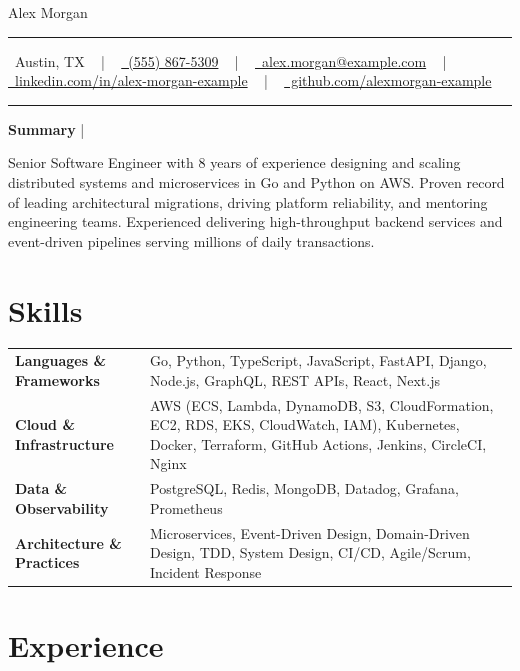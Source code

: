 \documentclass[letterpaper,10pt]{article}
\newcommand{\documentTitle}[2]{
  \begin{center}
    {\Huge\color{accentTitle} #1}
    \vspace{10pt}
    {\color{accentLine} \hrule}
    \vspace{2pt}
    \footnotesize{#2}
    \vspace{2pt}
    {\color{accentLine} \hrule}
  \end{center}
}
\newcommand{\tinysection}[1]{
  \phantomsection
  \addcontentsline{toc}{section}{#1}
  {\large{\bfseries\color{accentText}#1} {\color{accentLine} |}}
}
\begin{document}
  \documentTitle{Alex Morgan}{
    \raisebox{-0.15\height} \faMapMarker~Austin, TX ~ | ~
    \href{tel:5558675309}{
      \raisebox{-0.05\height} \faPhone~(555) 867-5309} ~ | ~
    \href{mailto:alex.morgan@example.com}{
      \raisebox{-0.15\height} \faEnvelope~alex.morgan@example.com} ~ | ~
    \href{https://www.linkedin.com/in/alex-morgan-example/}{
      \raisebox{-0.15\height} \faLinkedin~linkedin.com/in/alex-morgan-example} ~ | ~
    \href{https://github.com/alexmorgan-example}{
      \raisebox{-0.15\height} \faGithub~github.com/alexmorgan-example}
  }

  \tinysection{Summary}
  Senior Software Engineer with 8 years of experience designing and scaling distributed systems and microservices in Go and Python on AWS. Proven record of leading architectural migrations, driving platform reliability, and mentoring engineering teams. Experienced delivering high-throughput backend services and event-driven pipelines serving millions of daily transactions.

\section{Skills}
\begin{tabularx}{\textwidth}{>{\bfseries}l@{\hspace{12pt}} X}
Languages \& Frameworks & Go, Python, TypeScript, JavaScript, FastAPI, Django, Node.js, GraphQL, REST APIs, React, Next.js \\
Cloud \& Infrastructure & AWS (ECS, Lambda, DynamoDB, S3, CloudFormation, EC2, RDS, EKS, CloudWatch, IAM), Kubernetes, Docker, Terraform, GitHub Actions, Jenkins, CircleCI, Nginx \\
Data \& Observability & PostgreSQL, Redis, MongoDB, Datadog, Grafana, Prometheus \\
Architecture \& Practices & Microservices, Event-Driven Design, Domain-Driven Design, TDD, System Design, CI/CD, Agile/Scrum, Incident Response \\
\end{tabularx}

  \section{Experience}
\end{document}
